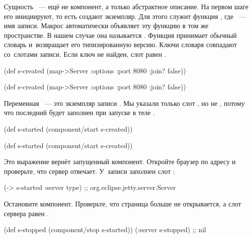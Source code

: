 Сущность ~--- ещё не компонент, а только абстрактное описание. На
первом шаге его инициируют, то есть создают экземпляр. Для этого служит функция
, где ~--- имя записи. Макрос
 автоматически объявляет эту функцию в том же пространстве. В
нашем случае она называется . Функция принимает обычный
словарь и~возвращает его типизированную версию. Ключи словаря совпадают
со~слотами записи. Если ключ не найден, слот равен .

\ifnarrow

\begin{clojure}
(def s-created
  (map->Server
    {:options {:port 8080
               :join? false}}))
\end{clojure}

\else

\begin{clojure}
(def s-created
  (map->Server {:options {:port 8080 :join? false}}))
\end{clojure}

\fi

Переменная ~--- это экземпляр записи . Мы указали
только слот , но не , потому что последний будет
заполнен при запуске в теле .

\ifnarrow

\begin{clojure}
(def s-started
  (component/start s-created))
\end{clojure}

\else

\begin{clojure}
(def s-started (component/start s-created))
\end{clojure}

\fi

Это выражение вернёт запущенный компонент. Откройте браузер по адресу
 и проверьте, что сервер отвечает. У~записи
 заполнен слот :

\begin{clojure}
(-> s-started :server type)
;; org.eclipse.jetty.server.Server
\end{clojure}

Остановите компонент. Проверьте, что страница больше не открывается, а слот
сервера равен .

\ifnarrow

\begin{clojure}
(def s-stopped
  (component/stop s-started))
(:server s-stopped) ;; nil
\end{clojure}

